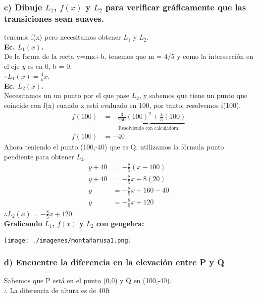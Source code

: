 \documentclass[11pt,letterpaper]{article}
\begin{document}
\subsubsection{c) Dibuje $L_1$, $f(x)$ y $L_2$ para verificar gráficamente que las transiciones sean suaves.}
tenemos f(x) pero necesitamos obtener $L_1$ y $L_2$. \\
\textbf{Ec. $L_1(x)$.} \\
De la forma de la recta y=mx+b, tenemos que m = 4/5 y como la intersección en el eje \textit{y} es en 0, b = 0. \\
$\therefore L_1(x)=\frac{4}{5}x$. \\
\textbf{Ec. $L_2(x)$.}\\
Necesitamos un un punto por el que pase $L_2$, y sabemos que tiene un punto que coincide con f(x) cuando x está evaluado en 100, por tanto, resolvemos f(100).
\begin{equation*}
  \begin{split}
    f(100) &= \underbrace{-\frac{3}{250}(100)^2+\frac{4}{5}(100)}_{\text{Resolviendo con calculadora.}} \\
    f(100) &= -40
  \end{split}
\end{equation*}
Ahora teniendo el punto (100,-40) que es Q, utilizamos la fórmula punto pendiente para obtener $L_2$.
\begin{equation*}
  \begin{split}
    y+40 &= -\frac{8}{5}(x-100) \\
    y+40 &= -\frac{8}{5}x+8(20) \\
    y &= -\frac{8}{5}x+160-40 \\
    y &= -\frac{8}{5}x+120
  \end{split}
\end{equation*}
$\therefore L_2(x)=-\frac{8}{5}x+120$. \\
\textbf{Graficando $L_1$, $f(x)$ y $L_2$ con geogebra:}
\begin{center}
  \texttt{[image: ./imagenes/montañarusa1.png]}
\end{center}

\subsubsection{d) Encuentre la diferencia en la elevación entre P y Q}
Sabemos que P está en el punto (0,0) y Q en (100,-40). \\
$\therefore$ La diferencia de altura es de 40ft
\end{document}
